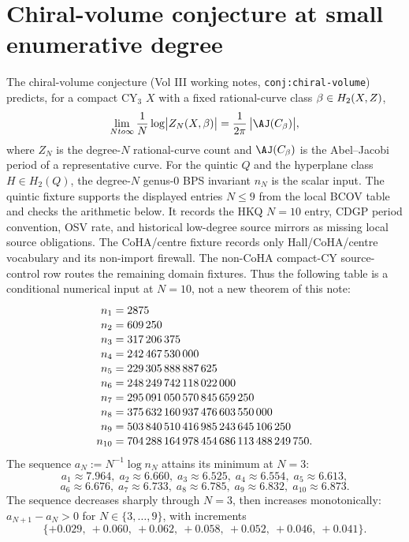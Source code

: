 \documentclass[12pt]{amsart}
\theoremstyle{remark}
\begin{document}
\section{Chiral-volume conjecture at small enumerative degree}

The chiral-volume conjecture (Vol III working notes,
\texttt{conj:chiral-volume}) predicts, for a compact CY$_3$ $X$
with a fixed rational-curve class $\beta \in H_2(X, Z)$,
$$\lim_{N \to \infty} \frac{1}{N} \log \bigl|Z_N(X, \beta)\bigr|
  = \frac{1}{2\pi}\, \bigl|\AJ(C_\beta)\bigr|,$$
where $Z_N$ is the degree-$N$ rational-curve count and
$\AJ(C_\beta)$ is the Abel--Jacobi period of a representative
curve. For the quintic $Q$ and the hyperplane class $H \in H_2(Q)$,
the degree-$N$ genus-$0$ BPS invariant \(n_N\) is the scalar input. The
quintic fixture supports the displayed entries \(N\leq9\) from the local
BCOV table and checks the arithmetic below. It records the HKQ \(N=10\)
entry, CDGP period convention, OSV rate, and historical low-degree
source mirrors as missing local source obligations. The CoHA/centre
fixture
records only Hall/CoHA/centre vocabulary and its non-import firewall.
The non-CoHA compact-CY source-control row
routes the remaining domain fixtures. Thus the following table is a
conditional numerical input at \(N=10\), not a new theorem of this note:
$$\renewcommand{\arraystretch}{1.1}
\begin{array}{r@{\;=\;}l}
  n_1 & 2875 \\
  n_2 & 609\,250 \\
  n_3 & 317\,206\,375 \\
  n_4 & 242\,467\,530\,000 \\
  n_5 & 229\,305\,888\,887\,625 \\
  n_6 & 248\,249\,742\,118\,022\,000 \\
  n_7 & 295\,091\,050\,570\,845\,659\,250 \\
  n_8 & 375\,632\,160\,937\,476\,603\,550\,000 \\
  n_9 & 503\,840\,510\,416\,985\,243\,645\,106\,250 \\
  n_{10} & 704\,288\,164\,978\,454\,686\,113\,488\,249\,750.
\end{array}$$
The sequence $a_N := N^{-1} \log n_N$ attains its minimum at $N=3$:
$$
a_1 \approx 7.964,\;
a_2 \approx 6.660,\;
a_3 \approx 6.525,\;
a_4 \approx 6.554,\;
a_5 \approx 6.613,
$$
$$
a_6 \approx 6.676,\;
a_7 \approx 6.733,\;
a_8 \approx 6.785,\;
a_9 \approx 6.832,\;
a_{10} \approx 6.873.
$$
The sequence decreases sharply through $N = 3$, then increases
monotonically: $a_{N+1} - a_N > 0$ for $N \in \{3, \dots, 9\}$, with
increments
\[
\{+0.029,\ +0.060,\ +0.062,\ +0.058,\ +0.052,\ +0.046,\ +0.041\}.
\]
\end{document}
